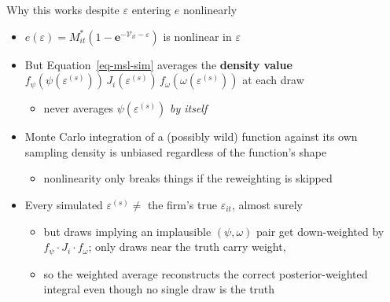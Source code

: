 \documentclass[
  ignorenonframetext,
  aspectratio=169,
]{beamer}
\providecommand{\tightlist}{%
  \setlength{\itemsep}{0pt}\setlength{\parskip}{0pt}}
\begin{document}
\begin{frame}{Why this works despite \(\varepsilon\) entering \(e\)
nonlinearly}
\protect{}\label{why-this-works-despite-varepsilon-entering-e-nonlinearly}
\begin{itemize}
\tightlist
\item
  \(e(\varepsilon)=M^*_{it}(1-\textbf{e}^{-\mathcal V_{it}-\varepsilon})\)
  is nonlinear in \(\varepsilon\)
\item
  But Equation~\ref{eq-msl-sim} averages the \textbf{density value}
  \(f_\psi(\psi(\varepsilon^{(s)}))\,J_i(\varepsilon^{(s)})\,f_\omega(\omega(\varepsilon^{(s)}))\)
  at each draw

  \begin{itemize}
  \tightlist
  \item
    never averages \(\psi(\varepsilon^{(s)})\) \emph{by itself}
  \end{itemize}
\item
  Monte Carlo integration of a (possibly wild) function against its own
  sampling density is unbiased regardless of the function's shape

  \begin{itemize}
  \tightlist
  \item
    nonlinearity only breaks things if the reweighting is skipped
  \end{itemize}
\item
  Every simulated \(\varepsilon^{(s)}\ne\) the firm's true
  \(\varepsilon_{it}\), almost surely

  \begin{itemize}
  \tightlist
  \item
    but draws implying an implausible \((\psi,\omega)\) pair get
    down-weighted by \(f_\psi\cdot J_i\cdot f_\omega\); only draws near
    the truth carry weight,
  \item
    so the weighted average reconstructs the correct posterior-weighted
    integral even though no single draw is the truth
  \end{itemize}
\end{itemize}
\end{frame}
\end{document}
